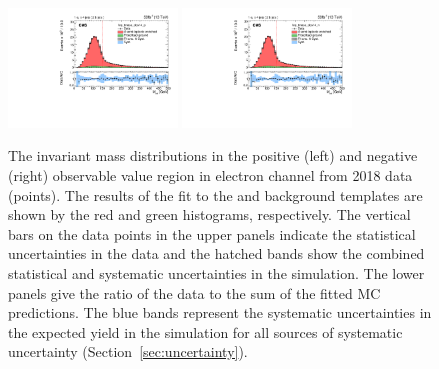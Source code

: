 \begin{figure}
    \includegraphics[width=0.4\textwidth]{figure/FitResult_18_el_lep_tmass_obs14_p_chi2_20.pdf}
    \includegraphics[width=0.4\textwidth]{figure/FitResult_18_el_lep_tmass_obs14_n_chi2_20.pdf}
    \caption[The \Mlb invariant mass distributions in electron channel from 2018 data.]
    {
        The \Mlb invariant mass distributions in the positive (left) and negative (right) observable value region in electron channel from 2018 data (points).
        The results of the fit to the \ttbar and background templates are shown by the red and green histograms, respectively.
        The vertical bars on the data points in the upper panels indicate the statistical uncertainties in the data and the hatched bands show the combined statistical and systematic uncertainties in the simulation.
        The lower panels give the ratio of the data to the sum of the fitted MC predictions.
        The blue bands represent the systematic uncertainties in the expected yield in the simulation for all sources of systematic uncertainty (Section~\ref{sec:uncertainty}).
    }
    \label{fig:fitting_results_18_el}
\end{figure}

